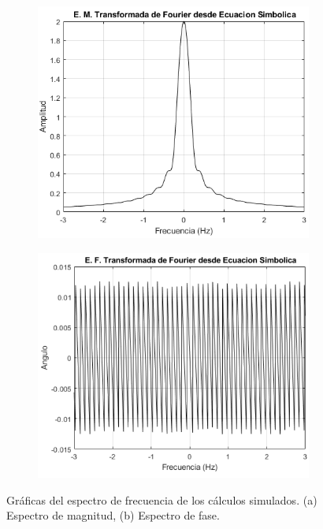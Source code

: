 \documentclass[11pt,letterpaper,twocolumn]{article}
\begin{document}
        \begin{figure}[H]
            \centering 
            \begin{subfigure}[h]{0.49\linewidth}
                \includegraphics[width=\linewidth]{img/EMagnitudTF_ESimbolica.png}
                \caption{}
                \label{magnitudTeorica}
            \end{subfigure}
            \begin{subfigure}[h]{0.49\linewidth}
                \includegraphics[width=\linewidth]{img/EFaseTF_ESimbolica.png}
                \caption{}
                \label{faseTorica}
            \end{subfigure}
            \caption{Gráficas del espectro de frecuencia de los cálculos simulados. (a) Espectro 
                    de magnitud, (b) Espectro de fase.}
            \label{espectroTeorico}
        \end{figure} 
        \vspace{-5mm}
    
\end{document}

